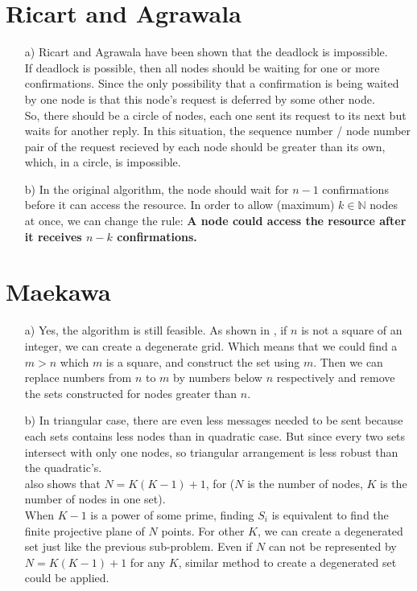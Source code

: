 \documentclass[a4paper, 14pt]{article}
\begin{document}
\section{Ricart and Agrawala}

\begin{itemize}
\item[a)] Ricart and Agrawala have been shown that the deadlock is impossible. \cite{Ricart1981} \\
  If deadlock is possible, then all nodes should be waiting for one or more
  confirmations. Since the only possibility that a confirmation is
  being waited by one node is that this node's request is deferred by
  some other node. \\
  So, there should be a circle of nodes, each one sent its request to
  its next but waits for another reply. In this situation, the
  sequence number / node number pair of the request recieved by each
  node should be greater than its own, which, in a circle, is
  impossible.\\ 
\item[b)] In the original algorithm, the node should wait for $n-1$
  confirmations before it can access the resource. In order to allow
  (maximum) $k \in \mathbb{N}$ nodes at once, we can change the rule:
  {\bf A node could access the resource after it receives $n-k$
  confirmations.} 
\end{itemize}

\section{Maekawa}
\begin{itemize}
\item[a)] Yes, the algorithm is still feasible. As shown in
  \cite{Maekawa1985}, if $n$ is not a square of an integer, we can
  create a degenerate grid. Which means that we could find a $m > n$
  which $m$ is a square, and construct the set using $m$. Then we can
  replace numbers from $n$ to $m$ by numbers below $n$ respectively
  and remove the sets constructed for nodes greater than $n$.
\item[b)] In triangular case, there are even less messages needed to
  be sent because each sets contains less nodes than in quadratic
  case. But since every two sets intersect with only one nodes, so
  triangular arrangement is less robust than the quadratic's.\\
\cite{Maekawa1985} also shows that $N = K(K - 1) + 1$, for ($N$ is the
number of nodes, $K$ is the number of nodes in one set). \\
When $K - 1$ is a power of some prime, finding $S_i$ is equivalent to
find the finite projective plane of $N$ points. For other $K$, we can
create a degenerated set just like the previous sub-problem. Even if
$N$ can not be represented by $N = K(K - 1) + 1$ for any $K$, similar
method to create a degenerated set could be applied.
\end{itemize}
\newpage

{}
\end{document}
